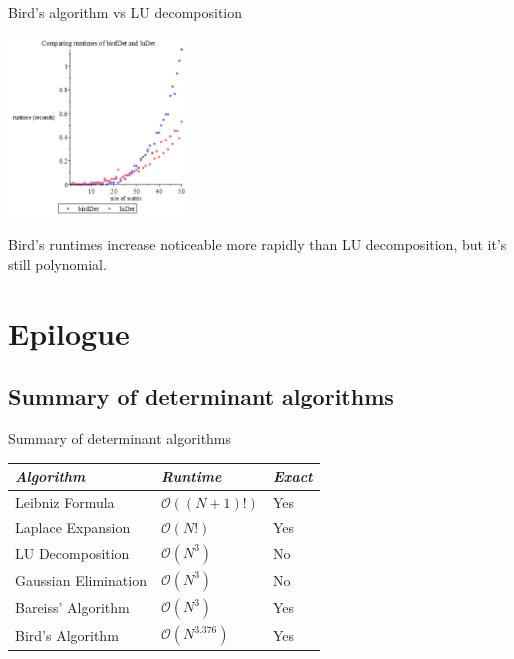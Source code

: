 \documentclass{beamer}
\begin{document}
\begin{frame}{Bird's algorithm vs LU decomposition}
    \begin{center}{}
        \includegraphics[height=180]{bird-lu}
    \end{center}

    Bird's runtimes increase noticeable more rapidly than LU decomposition,
    but it's still polynomial.
\end{frame}

\section{Epilogue}

\subsection{Summary of determinant algorithms}

\begin{frame}{Summary of determinant algorithms}
    \begin{tabular}{l l l}
        \toprule
        \emph{Algorithm}     & \emph{Runtime}           & \emph{Exact} \\
        \midrule
        Leibniz Formula      & $\mathcal{O}((N+1)!)$    & Yes \\
        Laplace Expansion    & $\mathcal{O}(N!)$        & Yes \\
        LU Decomposition     & $\mathcal{O}(N^3)$       & No \\
        Gaussian Elimination & $\mathcal{O}(N^3)$       & No \\
        Bareiss' Algorithm   & $\mathcal{O}(N^3)$       & Yes \\
        Bird's Algorithm     & $\mathcal{O}(N^{3.376})$ & Yes \\
        \bottomrule
    \end{tabular}

\end{frame}
\end{document}
